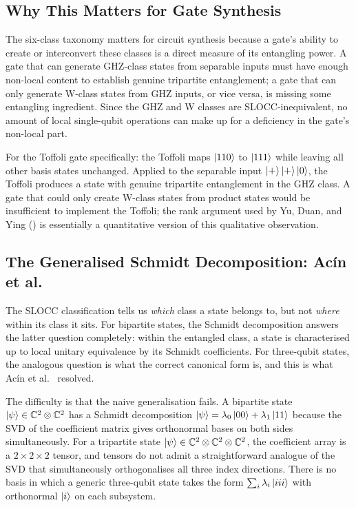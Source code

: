 \documentclass[12pt, a4paper, oneside]{report}
\theoremstyle{plain}
\theoremstyle{definition}
\theoremstyle{remark}
\newcommand{\CC}{\mathbb{C}}
\begin{document}
\subsection{Why This Matters for Gate Synthesis}

The six-class taxonomy matters for circuit synthesis because a gate's ability to create or
interconvert these classes is a direct measure of its entangling power. A gate that can
generate GHZ-class states from separable inputs must have enough non-local content to
establish genuine tripartite entanglement; a gate that can only generate W-class states from
GHZ inputs, or vice versa, is missing some entangling ingredient. Since the GHZ and W classes
are SLOCC-inequivalent, no amount of local single-qubit operations can make up for a
deficiency in the gate's non-local part.

For the Toffoli gate specifically: the Toffoli maps $\ket{110}$ to $\ket{111}$ while leaving
all other basis states unchanged. Applied to the separable input
$\ket{+}\ket{+}\ket{0}$, the Toffoli produces a state with genuine tripartite entanglement
in the GHZ class. A gate that could only create W-class states from product states would be
insufficient to implement the Toffoli; the rank argument used by Yu, Duan, and Ying
() is essentially a quantitative version of this qualitative observation.

\subsection{The Generalised Schmidt Decomposition: Acín et al.}

The SLOCC classification tells us \emph{which} class a state belongs to, but not \emph{where}
within its class it sits. For bipartite states, the Schmidt decomposition answers the latter
question completely: within the entangled class, a state is characterised up to local unitary
equivalence by its Schmidt coefficients. For three-qubit states, the analogous question is
what the correct canonical form is, and this is what Acín et al.~\cite{acin2000} resolved.

The difficulty is that the naive generalisation fails. A bipartite state $\ket{\psi}
	\in \CC^2 \otimes \CC^2$ has a Schmidt decomposition $\ket{\psi} = \lambda_0\ket{00} +
	\lambda_1\ket{11}$ because the SVD of the coefficient matrix gives orthonormal bases on
both sides simultaneously. For a tripartite state $\ket{\psi} \in \CC^2 \otimes \CC^2
	\otimes \CC^2$, the coefficient array is a $2 \times 2 \times 2$ tensor, and tensors do not
admit a straightforward analogue of the SVD that simultaneously orthogonalises all three
index directions. There is no basis in which a generic three-qubit state takes the form
$\sum_i \lambda_i \ket{iii}$ with orthonormal $\ket{i}$ on each subsystem.
\end{document}
